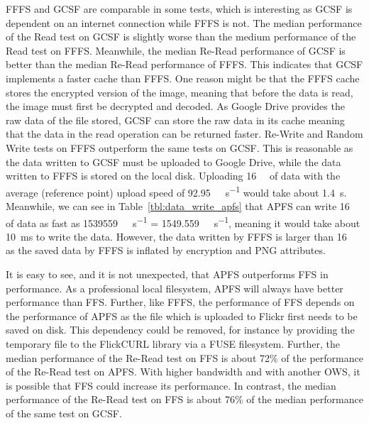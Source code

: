 \gls{FFFS} and \gls{GCSF} are comparable in some tests, which is interesting as \gls{GCSF} is dependent on an internet connection while \gls{FFFS} is not. The median performance of the Read test on \gls{GCSF} is slightly worse than the medium performance of the Read test on \gls{FFFS}. Meanwhile, the median \mbox{Re-Read} performance of \gls{GCSF} is better than the median \mbox{Re-Read} performance of \gls{FFFS}. This indicates that \gls{GCSF} implements a faster cache than \gls{FFFS}. One reason might be that the \gls{FFFS} cache stores the encrypted version of the image, meaning that before the data is read, the image must first be decrypted and decoded. As Google Drive provides the raw data of the file stored, \gls{GCSF} can store the raw data in its cache meaning that the data in the read operation can be returned faster. \mbox{Re-Write} and Random Write tests on \gls{FFFS} outperform the same tests on \gls{GCSF}. This is reasonable as the data written to \gls{GCSF} must be uploaded to Google Drive, while the data written to \gls{FFFS} is stored on the local disk. Uploading \SI{16}{\mega\byte} of data with the average (reference point) upload speed of \SI[per-mode = symbol]{92.95}{\mega\bit\per\second} would take about \SI{1.4}{\second}. Meanwhile, we can see in Table~\ref{tbl:data_write_apfs} that \gls{APFS} can write \SI{16}{\mega\byte} of data as fast as \SI[per-mode = symbol]{1539559}{\kilo\byte\per\second} = \SI[per-mode = symbol]{1549.559}{\mega\byte\per\second}, meaning it would take about \SI{10}{\milli\second} to write the data. However, the data written by \gls{FFFS} is larger than \SI{16}{\mega\byte} as the saved data by \gls{FFFS} is inflated by encryption and PNG attributes.

It is easy to see, and it is not unexpected, that \gls{APFS} outperforms \gls{FFS} in performance. As a professional local filesystem, \gls{APFS} will always have better performance than FFS. Further, like \gls{FFFS}, the performance of \gls{FFS} depends on the performance of \gls{APFS} as the file which is uploaded to Flickr first needs to be saved on disk. This dependency could be removed, for instance by providing the temporary file to the FlickCURL library via a \gls{FUSE} filesystem. Further, the median performance of the \mbox{Re-Read} test on \gls{FFS} is about 72\% of the performance of the \mbox{Re-Read} test on \gls{APFS}. With higher bandwidth and with another \gls{OWS}, it is possible that \gls{FFS} could increase its performance. In contrast, the median performance of the \mbox{Re-Read} test on \gls{FFS} is about 76\% of the median performance of the same test on \gls{GCSF}.